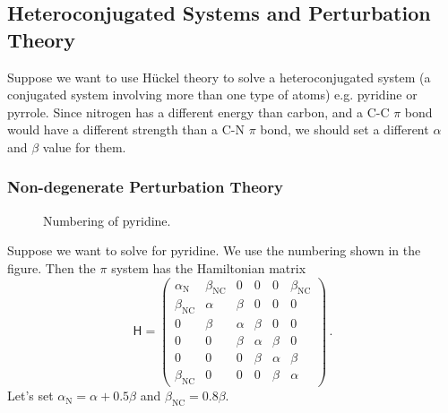 \documentclass{article}
\theoremstyle{plain}\theoremheaderfont{\normalfont\itshape}\theorembodyfont{\rmfamily}\theoremseparator{.}\newtheorem*{rem}{Remark}\newtheorem*{ex}{Example}\newtheorem*{proof}{Proof}\newtheorem*{altp}{Alternative proof}
\theoremstyle{plain}\theoremheaderfont{\normalfont\bfseries}\theorembodyfont{\rmfamily}\theoremseparator{.}\newtheorem{thm}{Theorem}[section]\newtheorem{lem}[thm]{Lemma}\newtheorem{prop}[thm]{Proposition}\newtheorem*{cor}{Corollary}\newtheorem{defn}[thm]{Definition}\newtheorem{clm}[thm]{Claim}\newtheorem{clminproof}{Claim}\newtheorem{pos}{Postulate}[section]
\theoremstyle{break}\theoremheaderfont{\normalfont\itshape}\theorembodyfont{\rmfamily}\theoremseparator{.\medskip}\newtheorem*{proofskip}{Proof}\newtheorem*{exs}{Examples}\newtheorem*{rems}{Remarks}
\theoremstyle{break}\theoremheaderfont{\normalfont\bfseries}\theorembodyfont{\rmfamily}\theoremseparator{.\medskip}\newtheorem{lemskip}[thm]{Lemma}\newtheorem{defnskip}[thm]{Definition}\newtheorem{propskip}[thm]{Proposition}\newtheorem{thmskip}[thm]{Theorem}
\numberwithin{equation}{section}
\begin{document}
    \subsection{Heteroconjugated Systems and Perturbation Theory}
    Suppose we want to use H\"{u}ckel theory to solve a heteroconjugated system (a conjugated system involving more than one type of atoms) e.g. pyridine or pyrrole. Since nitrogen has a different energy than carbon, and a C-C \(\pi\) bond would have a different strength than a C-N \(\pi\) bond, we should set a different \(\alpha\) and \(\beta\) value for them.

    \subsubsection{Non-degenerate Perturbation Theory}
    \begin{figure}
        \centering
        \caption{Numbering of pyridine.}
    \end{figure}

    Suppose we want to solve for pyridine. We use the numbering shown in the figure. Then the \(\pi\) system has the Hamiltonian matrix
    \begin{equation}
        \mathsf{H}=\begin{pmatrix}
            \alpha_{\mathrm{N}} & \beta_{\mathrm{NC}} & 0 & 0 & 0 & \beta_{\mathrm{NC}} \\
            \beta_{\mathrm{NC}} & \alpha & \beta & 0 & 0 & 0 \\
            0 & \beta & \alpha & \beta & 0 & 0 \\
            0 & 0 & \beta & \alpha & \beta & 0 \\
            0 & 0 & 0 & \beta & \alpha & \beta \\
            \beta_{\mathrm{NC}} & 0 & 0 & 0 & \beta & \alpha
        \end{pmatrix}\,.
    \end{equation}
    Let's set \(\alpha_{\mathrm{N}}=\alpha+0.5\beta\) and \(\beta_{\mathrm{NC}}=0.8\beta\).
\end{document}
